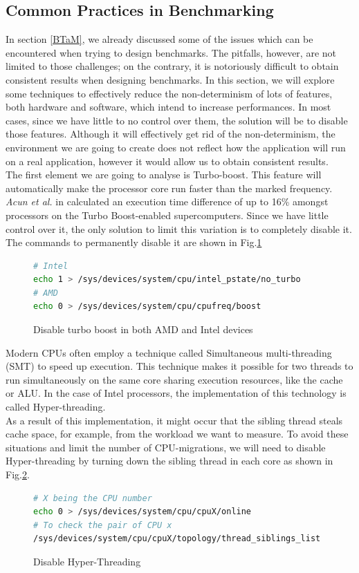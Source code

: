 \subsection{Common Practices in Benchmarking}\label{sec:ben_challenges} \label{sec:remove_inter}
In section \ref{BTaM}, we already discussed some of the issues which can be encountered when trying to design benchmarks. The pitfalls, however, are not limited to those challenges; on the contrary, it is notoriously difficult to obtain consistent results when designing benchmarks. In this section, we will explore some techniques to effectively reduce the non-determinism of lots of features, both hardware and software, which intend to increase performances. In most cases, since we have little to no control over them, the solution will be to disable those features. Although it will effectively get rid of the non-determinism, the environment we are going to create does not reflect how the application will run on a real application, however it would allow us to obtain consistent results. \\
The first element we are going to analyse is Turbo-boost. This feature will automatically make the processor core run faster than the marked frequency. \textit{Acun et al.} in \cite{turbo_boost} calculated an execution time difference of up to 16\% amongst processors on the Turbo Boost-enabled supercomputers. Since we have little control over it, the only solution to limit this variation is to completely disable it. The commands to permanently disable it are shown in Fig.\ref{fig:no_boos}
\begin{figure}[h]
\begin{lstlisting}[language=bash]
# Intel
echo 1 > /sys/devices/system/cpu/intel_pstate/no_turbo
# AMD
echo 0 > /sys/devices/system/cpu/cpufreq/boost
\end{lstlisting}
\caption{Disable turbo boost in both AMD and Intel devices}
\label{fig:no_boos}
\end{figure}

Modern CPUs often employ a technique called Simultaneous multi-threading (SMT) to speed up execution. This technique makes it possible for two threads to run simultaneously on the same core sharing execution resources, like the cache or ALU. In the case of Intel processors, the implementation of this technology is called Hyper-threading.\\
As a result of this implementation, it might occur that the sibling thread steals cache space, for example, from the workload we want to measure. To avoid these situations and limit the number of CPU-migrations, we will need to disable Hyper-threading by turning down the sibling thread in each core as shown in Fig.\ref{fig:no_ht}. 
\begin{figure}[h]
\begin{lstlisting}[language=bash]
# X being the CPU number
echo 0 > /sys/devices/system/cpu/cpuX/online
# To check the pair of CPU x
/sys/devices/system/cpu/cpuX/topology/thread_siblings_list
\end{lstlisting}
\caption{Disable Hyper-Threading}
\label{fig:no_ht}
\end{figure}

